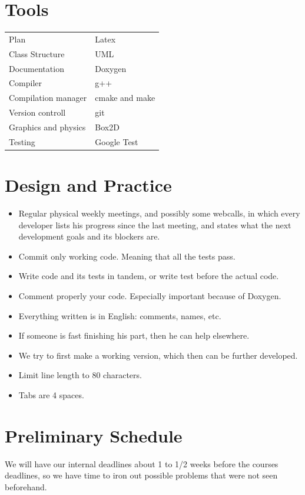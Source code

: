 \documentclass{article}
\begin{document}
\section{Tools}
\begin{tabular}{ll}
Plan                    & Latex \\
Class Structure         & UML \\
Documentation           & Doxygen \\
Compiler                & g++ \\
Compilation manager     & cmake and make \\
Version controll        & git \\
Graphics and physics    & Box2D \\
Testing                 & Google Test \\
\end{tabular}



\section{Design and Practice}
\begin{itemize}
\item Regular physical weekly meetings, and possibly some webcalls,
in which every developer lists his progress since the last meeting,
and states what the next development goals and its blockers are.
\item Commit only working code. Meaning that all the tests pass.
\item Write code and its tests in tandem, or write test before the actual code.
\item Comment properly your code. Especially important because of Doxygen.
\item Everything written is in English: comments, names, etc.
\item If someone is fast finishing his part, then he can help elsewhere.
\item We try to first make a working version, which then can be further
developed.
\item Limit line length to 80 characters.
\item Tabs are 4 spaces.
\end{itemize}



\section{Preliminary Schedule}
We will have our internal deadlines about 1 to 1/2 weeks before the
courses deadlines, so we have time to iron out possible problems that
were not seen beforehand.
\end{document}

